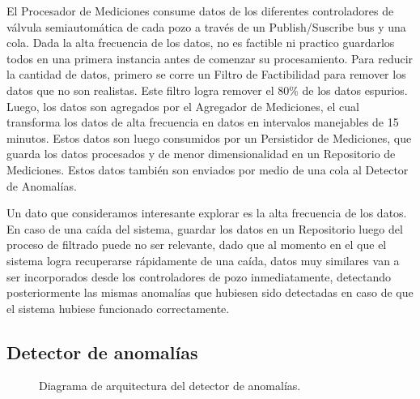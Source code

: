\documentclass{article}
\theoremstyle{definition}
\theoremstyle{remark}
\begin{document}
El Procesador de Mediciones consume datos de los diferentes controladores de válvula semiautomática de cada pozo a través de un Publish/Suscribe bus y una cola. Dada la alta frecuencia de los datos, no es factible ni practico guardarlos todos en una primera instancia antes de comenzar su procesamiento. Para reducir la cantidad de datos, primero se corre un Filtro de Factibilidad para remover los datos que no son realistas. Este filtro logra remover el 80\% de los datos espurios. Luego, los datos son agregados por el Agregador de Mediciones, el cual transforma los datos de alta frecuencia en datos en intervalos manejables de 15 minutos. Estos datos son luego consumidos por un Persistidor de Mediciones, que guarda los datos procesados y de menor dimensionalidad en un Repositorio de Mediciones. Estos datos también son enviados por medio de una cola al Detector de Anomalías.

Un dato que consideramos interesante explorar es la alta frecuencia de los datos. En caso de una caída del sistema, guardar los datos en un Repositorio luego del proceso de filtrado puede no ser relevante, dado que al momento en el que el sistema logra recuperarse rápidamente de una caída, datos muy similares van a ser incorporados desde los controladores de pozo inmediatamente, detectando posteriormente las mismas anomalías que hubiesen sido detectadas en caso de que el sistema hubiese funcionado correctamente.

\subsection{Detector de anomalías} \label{detector_anomalias}

\begin{figure}[H]
  \caption{Diagrama de arquitectura del detector de anomalías.}
\end{figure}
\end{document}
